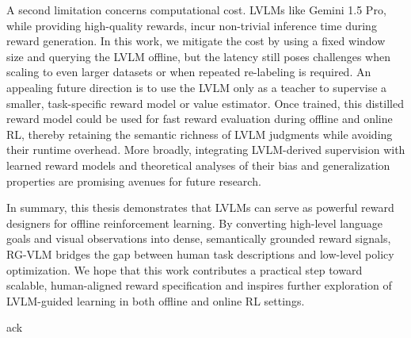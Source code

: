 \documentclass[master,english,final]{kaist-ucs}
\begin{document}
A second limitation concerns computational cost. LVLMs like Gemini 1.5 Pro, while providing high-quality rewards, incur non-trivial inference time during reward generation. In this work, we mitigate the cost by using a fixed window size and querying the LVLM offline, but the latency still poses challenges when scaling to even larger datasets or when repeated re-labeling is required. An appealing future direction is to use the LVLM only as a teacher to supervise a smaller, task-specific reward model or value estimator. Once trained, this distilled reward model could be used for fast reward evaluation during offline and online RL, thereby retaining the semantic richness of LVLM judgments while avoiding their runtime overhead. More broadly, integrating LVLM-derived supervision with learned reward models and theoretical analyses of their bias and generalization properties are promising avenues for future research.

In summary, this thesis demonstrates that LVLMs can serve as powerful reward designers for offline reinforcement learning. By converting high-level language goals and visual observations into dense, semantically grounded reward signals, RG-VLM bridges the gap between human task descriptions and low-level policy optimization. We hope that this work contributes a practical step toward scalable, human-aligned reward specification and inspires further exploration of LVLM-guided learning in both offline and online RL settings.







\acknowledgment[3]
ack


\curriculumvitae[3]
\end{document}

